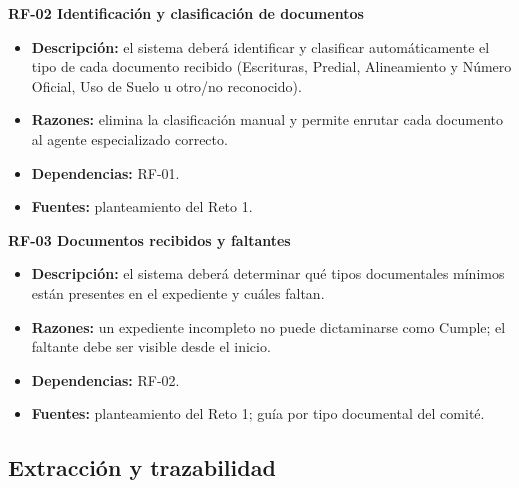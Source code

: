 \documentclass[11pt, a4paper]{article}
\begin{document}
\textbf{RF-02 Identificación y clasificación de documentos}
\begin{itemize}
    \item \textbf{Descripción:} el sistema deberá identificar y clasificar automáticamente el tipo de cada documento recibido (Escrituras, Predial, Alineamiento y Número Oficial, Uso de Suelo u otro/no reconocido).
    \item \textbf{Razones:} elimina la clasificación manual y permite enrutar cada documento al agente especializado correcto.
    \item \textbf{Dependencias:} RF-01.
    \item \textbf{Fuentes:} planteamiento del Reto 1.
\end{itemize}

\textbf{RF-03 Documentos recibidos y faltantes}
\begin{itemize}
    \item \textbf{Descripción:} el sistema deberá determinar qué tipos documentales mínimos están presentes en el expediente y cuáles faltan.
    \item \textbf{Razones:} un expediente incompleto no puede dictaminarse como Cumple; el faltante debe ser visible desde el inicio.
    \item \textbf{Dependencias:} RF-02.
    \item \textbf{Fuentes:} planteamiento del Reto 1; guía por tipo documental del comité.
\end{itemize}

\subsection*{Extracción y trazabilidad}
\end{document}
